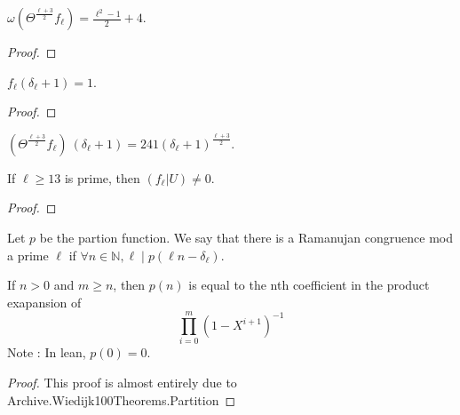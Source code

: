 \begin{theorem}
  \label{thm:Filt_Theta_l_add_three_div_two}
  \leanok
  $ \omega (\Theta^{\frac{\ell + 3}{2}} f_\ell)= \frac{\ell^2 - 1}{2} + 4 $.

\end{theorem}
\begin{proof}
  \leanok
\end{proof}

\begin{lemma}
  \label{lem:fl_delta_add_one}
  \leanok
  $f_\ell (\delta_\ell + 1) = 1$. 
\end{lemma}
\begin{proof}
  \leanok
\end{proof}

\begin{theorem}
  \label{thm:Theta_l_add_three_div_two_eq_241}
  \leanok
  $(\Theta^{\frac{\ell + 3}{2}} f_\ell) \: (\delta_\ell + 1) = 241 (\delta_\ell + 1)^{\frac{\ell + 3}{2}}$.
\end{theorem}

\begin{theorem}
  \label{thm:flu_ne_zero}
  \leanok
  If $\ell \ge 13$ is prime, then $(f_\ell | U) \neq 0.$

\end{theorem}
\begin{proof}
  \leanok
\end{proof}



\begin{definition}
  \label{def:ramanujan_congruence}
  \leanok
  Let $p$ be the partion function. We say that there is a Ramanujan congruence mod a prime $\ell$ if 
  $\forall n \in \mathbb{N}, \ell \mid p (\ell n - \delta_\ell).$
\end{definition}


\begin{theorem}
  \label{thm:partitionProduct_eq}
  \leanok
  If $n > 0$ and $m \ge n$, then $p (n)$ is equal to the nth coefficient in the product exapansion of
  \[ \prod_{i = 0}^{m} (1 - X^{i + 1})^{-1} \]
  Note : In lean, $p (0) = 0$.
\end{theorem}
\begin{proof}
  \leanok
  This proof is almost entirely due to Archive.Wiedijk100Theorems.Partition
\end{proof}


